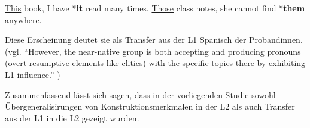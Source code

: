 \begin{exe}
    \ex \label{book2} \uline{This} book, I have *\textbf{it} read many times.
    \ex \label{notes} \uline{Those} class notes, she cannot find *\textbf{them} anywhere.
\end{exe}

Diese Erscheinung deutet sie als Transfer aus der L1 Spanisch der Probandinnen.
(vgl. ``However, the near-native group is both accepting and producing pronouns (overt resumptive elements like clitics) with the specific topics there by exhibiting L1 influence.'' \cite{Valenzuela05})

Zusammenfassend lässt sich sagen, dass in der vorliegenden Studie sowohl Übergeneralisirungen von Konstruktionsmerkmalen in der L2 als auch Transfer aus der L1 in die L2 gezeigt wurden.






